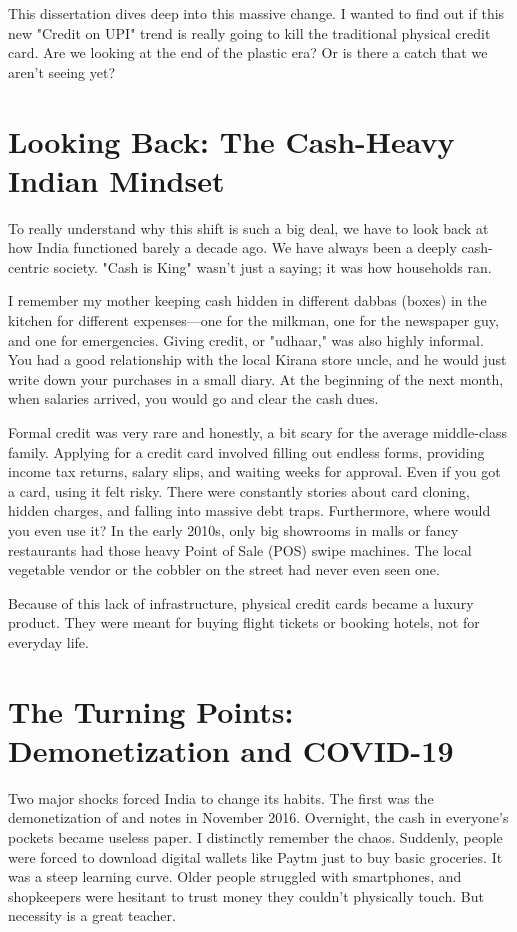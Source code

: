 This dissertation dives deep into this massive change. I wanted to find out if this new "Credit on UPI" trend is really going to kill the traditional physical credit card. Are we looking at the end of the plastic era? Or is there a catch that we aren't seeing yet?

\section{Looking Back: The Cash-Heavy Indian Mindset}

To really understand why this shift is such a big deal, we have to look back at how India functioned barely a decade ago. We have always been a deeply cash-centric society. "Cash is King" wasn't just a saying; it was how households ran.

I remember my mother keeping cash hidden in different dabbas (boxes) in the kitchen for different expenses---one for the milkman, one for the newspaper guy, and one for emergencies. Giving credit, or "udhaar," was also highly informal. You had a good relationship with the local Kirana store uncle, and he would just write down your purchases in a small diary. At the beginning of the next month, when salaries arrived, you would go and clear the cash dues.

Formal credit was very rare and honestly, a bit scary for the average middle-class family. Applying for a credit card involved filling out endless forms, providing income tax returns, salary slips, and waiting weeks for approval. Even if you got a card, using it felt risky. There were constantly stories about card cloning, hidden charges, and falling into massive debt traps. Furthermore, where would you even use it? In the early 2010s, only big showrooms in malls or fancy restaurants had those heavy Point of Sale (POS) swipe machines. The local vegetable vendor or the cobbler on the street had never even seen one.

Because of this lack of infrastructure, physical credit cards became a luxury product. They were meant for buying flight tickets or booking hotels, not for everyday life.

\section{The Turning Points: Demonetization and COVID-19}

Two major shocks forced India to change its habits. The first was the demonetization of  and  notes in November 2016. Overnight, the cash in everyone's pockets became useless paper. I distinctly remember the chaos. Suddenly, people were forced to download digital wallets like Paytm just to buy basic groceries. It was a steep learning curve. Older people struggled with smartphones, and shopkeepers were hesitant to trust money they couldn't physically touch. But necessity is a great teacher.

